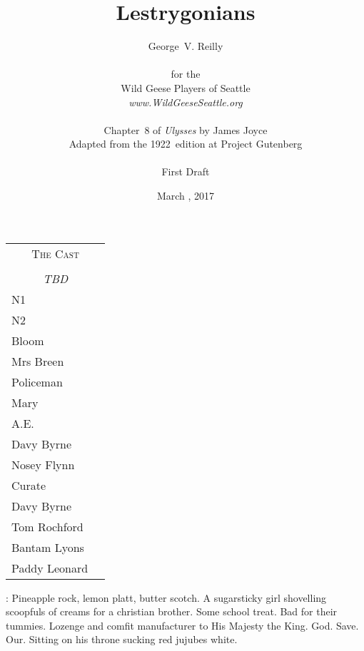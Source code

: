 


\title{\Huge Lestrygonians}
\author{George~V. Reilly\\
\\
{\small for the}\\
Wild Geese Players of Seattle\\
{\emph{www.WildGeeseSeattle.org}}\\
\\
{\small Chapter~8 of \emph{Ulysses} by James Joyce}\\
{\small Adapted from the 1922~edition at Project Gutenberg}
\\
\\
{\small First Draft}}
\date{March , 2017}
\raggedbottom



\maketitle
\thispagestyle{empty}
\pagebreak

\begin{tabular}{lp{10cm}}
    \multicolumn{2}{c}{\Large \textsc{The Cast}} \\
\\
    \multicolumn{2}{c}{\large \textit{TBD}} \\
N1 \\
N2 \\
Bloom \\
Mrs Breen \\
Policeman \\
Mary \\
A.E. \\
Davy Byrne \\
Nosey Flynn \\
Curate \\
Davy Byrne \\
Tom Rochford \\
Bantam Lyons \\
Paddy Leonard \\
\end{tabular}

\thispagestyle{empty}
\newpage


\setcounter{page}{1}

\BloomInt:
Pineapple rock, lemon platt, butter scotch.
A sugarsticky girl shovelling scoopfuls of creams for a christian brother.
Some school treat.
Bad for their tummies.
Lozenge and comfit manufacturer to His Majesty the King.
God.
Save.
Our.
Sitting on his throne sucking red jujubes white.

